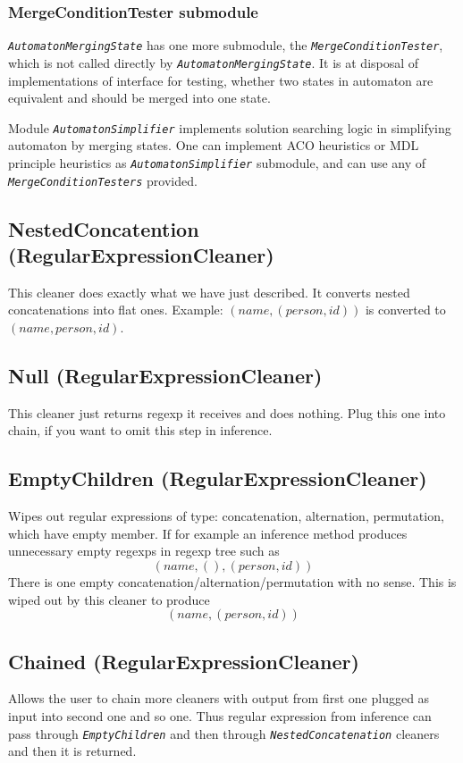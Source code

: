 \documentclass[a4paper,10pt,oneside]{article}
\newcommand{\code}[1]{\texttt{\StrSubstitute{#1}{.}{.\.}}}
\def\.{\discretionary{}{}{}}
\newcommand{\jmodule}[1]{\texttt{\textit{#1}}}
\begin{document}
\subsubsection{MergeConditionTester submodule}
\jmodule{AutomatonMergingState} has one more submodule, the \jmodule{MergeConditionTester}, which is not called directly by \jmodule{Au\.to\.ma\.ton\.Merg\.ing\.Sta\.te}.
It is at disposal of implementations of \code{AutomatonSimplifier} interface for testing, whether two states in automaton are equivalent and should be merged into one state.

Module \jmodule{AutomatonSimplifier} implements solution searching logic in simplifying automaton by merging states. %
One can implement ACO heuristics or MDL principle heuristics as \jmodule{AutomatonSimplifier} submodule, and can use any of \jmodule{MergeConditionTesters} provided.

\subsection{NestedConcatention (RegularExpressionCleaner)} \label{section_NestedConcatention}
This cleaner does exactly what we have just described. %
It converts nested concatenations into flat ones.
Example: $(name, (person, id))$ is converted to $(name, person, id)$.

\subsection{Null (RegularExpressionCleaner)} \label{section_Null}
This cleaner just returns regexp it receives and does nothing.
Plug this one into chain, if you want to omit this step in inference.

\subsection{EmptyChildren (RegularExpressionCleaner)} \label{section_EmptyChildren}
Wipes out regular expressions of type: concatenation, alternation, permutation, which have empty \code{children} member.
If for example an inference method produces unnecessary empty regexps in regexp tree such as
$$
(name, (), (person, id))
$$
There is one empty concatenation/alternation/permutation with no sense.
This is wiped out by this cleaner to produce 
$$
(name, (person, id))
$$

\subsection{Chained (RegularExpressionCleaner)} \label{section_Chained}
Allows the user to chain more cleaners with output from first one plugged as input into second one and so one.
Thus regular expression from inference can pass through \jmodule{EmptyChildren} and then through \jmodule{NestedConcatenation} cleaners and then it is returned.
\end{document}

